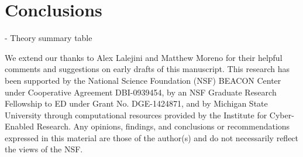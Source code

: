 \section{Conclusions}

- Theory summary table

\begin{acks}
We extend our thanks to Alex Lalejini and Matthew Moreno for their helpful comments and suggestions on early drafts of this manuscript. This research has been supported by the National Science Foundation (NSF) BEACON Center under Cooperative Agreement DBI-0939454, by an NSF Graduate Research Fellowship to ED under Grant No. DGE-1424871, and by Michigan State University through computational resources provided by the Institute for Cyber-Enabled Research. Any opinions, findings, and conclusions or recommendations expressed in this material are those of the author(s) and do not necessarily reflect the views of the NSF.
\end{acks}





